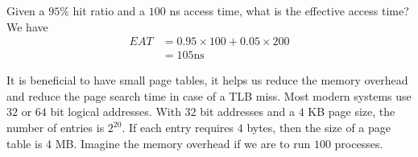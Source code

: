 \documentclass[a4paper]{article}
\theoremstyle{plain}
\theoremstyle{definition}
\newtheorem{defn}{Definition}[section]
\newtheorem{exmp}{Example}[section]
\theoremstyle{remark}
\begin{document}
\begin{tcolorbox}[colback=black!3!white,colframe=black!60!white,title=\begin{exmp}Access Time Example \label{Access Time Example}\end{exmp}]
        Given a $95\%$ hit ratio and a $100$ ns access time, what is the effective access time? We have
	\begin{align*}
		EAT &= 0.95 \times 100 + 0.05 \times 200\\
	&= 105\text{ns}
	\end{align*}
\end{tcolorbox}
\begin{tcolorbox}[colback=black!3!white,colframe=black!60!white,title=\begin{defn}Smaller Page Tables \label{Smaller Page Tables}\end{defn}]
It is beneficial to have small page tables, it helps us reduce the memory overhead and reduce the page search time in case of a TLB miss. Most modern systems use $32$ or $64$ bit logical addresses. With $32$ bit addresses and a $4$ KB page size, the number of entries is $2^{20}$. If each entry requires $4$ bytes, then the size of a page table is $4$ MB. Imagine the memory overhead if we are to run $100$ processes. 
\end{tcolorbox}
\end{document}
